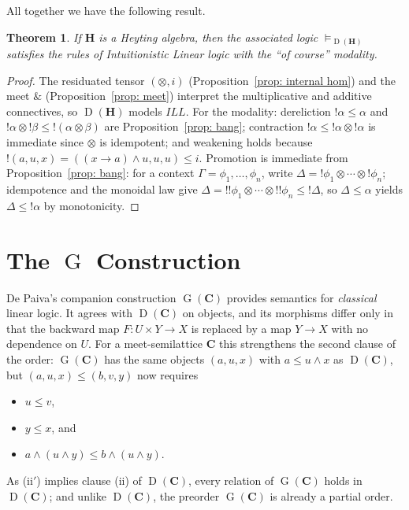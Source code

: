 \documentclass[reqno]{amsart}
\theoremstyle{plain}
\newtheorem{thm}{Theorem}
\theoremstyle{definition}
\DeclareMathOperator{\D}{D}
\DeclareMathOperator{\G}{G}
\newcommand{\cf}[1]{\mathbf{#1}}
\DeclareMathOperator{\Amp}{\&}
\begin{document}
All together we have the following result.
\begin{thm}\label{thm: bang ILL}
    If $\cf{H} $ is a Heyting algebra, then the associated logic $\vDash_{\D(\cf{H})}$ satisfies the rules of Intuitionistic Linear logic with the ``of course'' modality.
\end{thm}
\begin{proof}
    The residuated tensor $(\otimes, i)$ (Proposition~\ref{prop: internal hom}) and the meet $\Amp$ (Proposition~\ref{prop: meet}) interpret the multiplicative and additive connectives, so $\D(\cf{H})$ models $ILL$. For the modality: dereliction $!\alpha \leq \alpha$ and $!\alpha \otimes {!\beta} \leq {!(\alpha\otimes\beta)}$ are Proposition~\ref{prop: bang}; contraction $!\alpha \leq {!\alpha}\otimes{!\alpha}$ is immediate since $\otimes$ is idempotent; and weakening holds because $!(a,u,x) = ((x\rightarrow a)\wedge u, u, u) \leq i$. Promotion is immediate from Proposition~\ref{prop: bang}: for a context $\Gamma = \phi_1,\dots,\phi_n$, write $\Delta = {!\phi_1}\otimes\cdots\otimes{!\phi_n}$; idempotence and the monoidal law give $\Delta = {!!\phi_1}\otimes\cdots\otimes{!!\phi_n} \leq {!\Delta}$, so $\Delta \leq \alpha$ yields $\Delta \leq {!\alpha}$ by monotonicity.
\end{proof}


\section{The $\G$ Construction}

De Paiva's companion construction $\G(\cf{C})$ \cite{dePaiva1991} provides semantics for \emph{classical} linear logic. It agrees with $\D(\cf{C})$ on objects, and its morphisms differ only in that the backward map $F \colon U \times Y \to X$ is replaced by a map $Y \to X$ with no dependence on $U$. For a meet-semilattice $\cf{C}$ this strengthens the second clause of the order: $\G(\cf{C})$ has the same objects $(a,u,x)$ with $a \leq u \wedge x$ as $\D(\cf{C})$, but $(a,u,x) \leq (b,v,y)$ now requires
\begin{itemize}
    \item[(i)] $u \leq v$,
    \item[(ii$'$)] $y \leq x$, and
    \item[(iii)] $a \wedge (u \wedge y) \leq b \wedge (u \wedge y)$.
\end{itemize}
As (ii$'$) implies clause (ii) of $\D(\cf{C})$, every relation of $\G(\cf{C})$ holds in $\D(\cf{C})$; and unlike $\D(\cf{C})$, the preorder $\G(\cf{C})$ is already a partial order.
\end{document}

